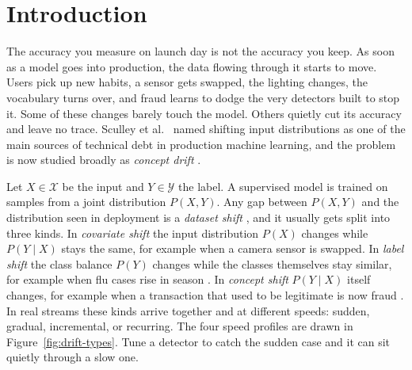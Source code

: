 \documentclass[sigconf,anonymous]{acmart}
\begin{document}


\maketitle

\section{Introduction}
\label{sec:intro}

The accuracy you measure on launch day is not the accuracy you keep. As soon
as a model goes into production, the data flowing through it starts to move.
Users pick up new habits, a sensor gets swapped, the lighting changes, the
vocabulary turns over, and fraud learns to dodge the very detectors built to
stop it. Some of these changes barely touch the model.
Others quietly cut its accuracy and leave no trace. Sculley et al.\
\cite{sculley2015debt} named shifting input distributions as one of the main
sources of technical debt in production machine learning, and the problem is
now studied broadly as \emph{concept drift} \cite{gama2014survey,
lu2018learning}.

Let $X \in \mathcal{X}$ be the input and $Y \in \mathcal{Y}$ the label. A
supervised model is trained on samples from a joint distribution $P(X, Y)$.
Any gap between $P(X, Y)$ and the distribution seen in deployment is a
\emph{dataset shift} \cite{quinonero2009dataset}, and it usually gets split
into three kinds. In \emph{covariate shift} the input distribution $P(X)$
changes while $P(Y \mid X)$ stays the same, for example when a camera sensor
is swapped. In \emph{label shift} the class balance $P(Y)$ changes while the
classes themselves stay similar, for example when flu cases rise in season
\cite{lipton2018label}. In \emph{concept shift} $P(Y \mid X)$ itself changes,
for example when a transaction that used to be legitimate is now fraud
\cite{gama2014survey, lu2018learning}. In real streams these kinds arrive
together and at different speeds: sudden, gradual, incremental, or recurring.
The four speed profiles are drawn in Figure~\ref{fig:drift-types}. Tune a
detector to catch the sudden case and it can sit quietly through a slow one.
\end{document}
